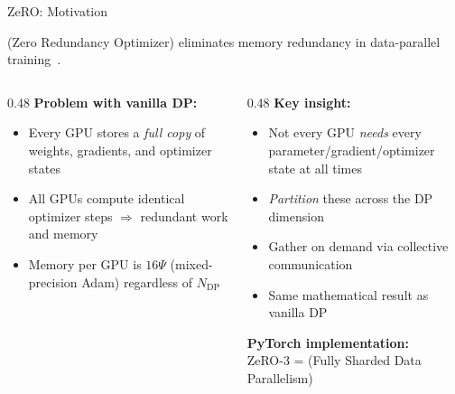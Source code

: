 
\begin{frame}{ZeRO: Motivation}

   (Zero Redundancy Optimizer) eliminates memory redundancy in data-parallel training~\cite{rajbhandari2020zero}.

  \vspace{0.5em}
  \begin{columns}
    \begin{column}{0.48\textwidth}
      \textbf{Problem with vanilla DP:}
      \begin{itemize}
        \item Every GPU stores a \emph{full copy} of weights, gradients, and optimizer states
        \item All GPUs compute identical optimizer steps $\Rightarrow$ redundant work and memory
        \item Memory per GPU is $16\Psi$ (mixed-precision Adam) regardless of $N_{\text{DP}}$
      \end{itemize}
    \end{column}
    \begin{column}{0.48\textwidth}
      \textbf{Key insight:}
      \begin{itemize}
        \item Not every GPU \emph{needs} every parameter/gradient/optimizer state at all times
        \item \emph{Partition} these across the DP dimension
        \item Gather on demand via collective communication
        \item Same mathematical result as vanilla DP
      \end{itemize}

      \vspace{0.3em}
      \textbf{PyTorch implementation:}\\
      ZeRO-3 =  (Fully Sharded Data Parallelism)
    \end{column}
  \end{columns}
\end{frame}

